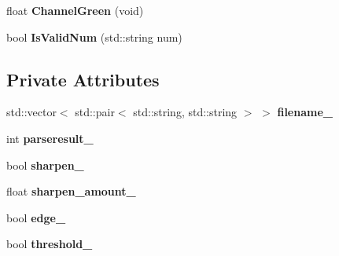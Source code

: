 \begin{DoxyCompactItemize}
\item 
float {\bfseries Channel\+Green} (void)\hypertarget{classimage__tools_1_1CommandParsing_aee394f33a66fe544551a397408ceab12}{}\label{classimage__tools_1_1CommandParsing_aee394f33a66fe544551a397408ceab12}

\item 
bool {\bfseries Is\+Valid\+Num} (std\+::string num)\hypertarget{classimage__tools_1_1CommandParsing_ac18569a930a22f02997cebd10d27e92e}{}\label{classimage__tools_1_1CommandParsing_ac18569a930a22f02997cebd10d27e92e}

\end{DoxyCompactItemize}
\subsection*{Private Attributes}
\begin{DoxyCompactItemize}
\item 
std\+::vector$<$ std\+::pair$<$ std\+::string, std\+::string $>$ $>$ {\bfseries filename\+\_\+}\hypertarget{classimage__tools_1_1CommandParsing_adadf4d0b895e3327c3bd6617141c2aeb}{}\label{classimage__tools_1_1CommandParsing_adadf4d0b895e3327c3bd6617141c2aeb}

\item 
int {\bfseries parseresult\+\_\+}\hypertarget{classimage__tools_1_1CommandParsing_a5379e76fbc9237a43f50e6bb6befac70}{}\label{classimage__tools_1_1CommandParsing_a5379e76fbc9237a43f50e6bb6befac70}

\item 
bool {\bfseries sharpen\+\_\+}\hypertarget{classimage__tools_1_1CommandParsing_afa8b25316315f6a36778bad989313d4c}{}\label{classimage__tools_1_1CommandParsing_afa8b25316315f6a36778bad989313d4c}

\item 
float {\bfseries sharpen\+\_\+amount\+\_\+}\hypertarget{classimage__tools_1_1CommandParsing_a94204b598f045cc2c0986fb395744ac5}{}\label{classimage__tools_1_1CommandParsing_a94204b598f045cc2c0986fb395744ac5}

\item 
bool {\bfseries edge\+\_\+}\hypertarget{classimage__tools_1_1CommandParsing_a2c26d3df8d8aa1b747aecca841daa5c2}{}\label{classimage__tools_1_1CommandParsing_a2c26d3df8d8aa1b747aecca841daa5c2}

\item 
bool {\bfseries threshold\+\_\+}\hypertarget{classimage__tools_1_1CommandParsing_a2069359a27eb0fd52f4ab7982aaf6389}{}\label{classimage__tools_1_1CommandParsing_a2069359a27eb0fd52f4ab7982aaf6389}


\end{DoxyCompactItemize}
